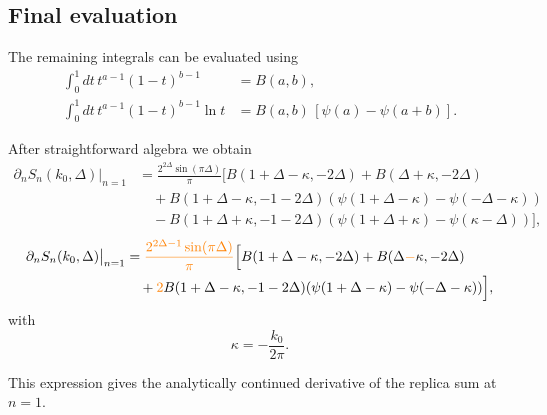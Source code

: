 \documentclass[11pt]{article}
\newcommand{\JM}[1]{\textcolor{orange}{#1}}
\begin{document}
\subsection{Final evaluation}

The remaining integrals can be evaluated using
\begin{align}
\int_0^1 dt\, t^{a-1}(1-t)^{b-1}&=B(a,b),\\
\int_0^1 dt\, t^{a-1}(1-t)^{b-1}\ln t
&=B(a,b)\,[\psi(a)-\psi(a+b)].
\end{align}

After straightforward algebra we obtain
\begin{equation}
\begin{aligned}
\partial_n S_n(k_0,\Delta)\big|_{n=1}
&=
\frac{2^{2\Delta}\sin(\pi\Delta)}{\pi}
\Big[
B(1+\Delta-\kappa,-2\Delta)
+
B(\Delta+\kappa,-2\Delta)
\\
&\quad
+
B(1+\Delta-\kappa,-1-2\Delta)
(\psi(1+\Delta-\kappa)-\psi(-\Delta-\kappa))
\\
&\quad
-
B(1+\Delta+\kappa,-1-2\Delta)
(\psi(1+\Delta+\kappa)-\psi(\kappa-\Delta))
\Big],
\end{aligned}
\end{equation}
\begin{equation}
\begin{aligned}
\partial_n S_n(k_0,\Delta)\big|_{n=1}
&=
\JM{\frac{2^{2\Delta-1}\sin(\pi\Delta)}{\pi}}
\Big[
B(1+\Delta-\kappa,-2\Delta)
+
B(\Delta\JM{-}\kappa,-2\Delta)
\\
&\quad
+ \JM{2}
B(1+\Delta-\kappa,-1-2\Delta)
(\psi(1+\Delta-\kappa)-\psi(-\Delta-\kappa))\Big],
\end{aligned}
\end{equation}
with
\begin{equation}
\kappa=-\frac{k_0}{2\pi}.
\end{equation}

This expression gives the analytically continued derivative of the replica
sum at $n=1$.
\end{document}
